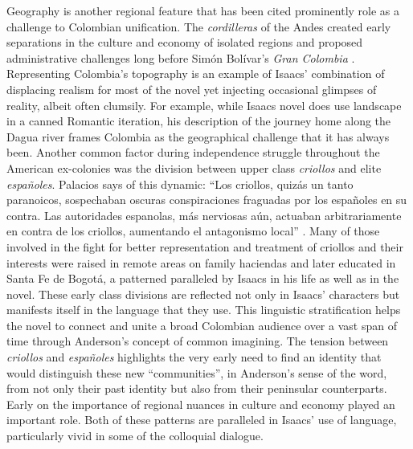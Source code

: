 \documentclass[12pt]{report}\usepackage[]{graphicx}\usepackage[]{color}
\begin{document}
\begin{spacing}{1.9}
Geography is another regional feature that has been cited prominently role as a challenge to Colombian unification.
The \textit{cordilleras} of the Andes created early separations in the culture and economy of isolated regions and proposed administrative challenges long before Simón Bolívar's \textit{Gran Colombia} \autocite[229]{Palacios2002}.
Representing Colombia's topography is an example of Isaacs' combination of displacing realism for most of the novel yet injecting occasional glimpses of reality, albeit often clumsily. 
For example, while Isaacs novel does use landscape in a canned Romantic iteration, his description of the journey home along the Dagua river frames Colombia as the geographical challenge that it has always been.
Another common factor during independence struggle throughout the American ex-colonies was the division between upper class \textit{criollos} and elite \textit{españoles}. 
Palacios says of this dynamic: \enquote{Los criollos, quizás un tanto paranoicos, sospechaban oscuras conspiraciones fraguadas por los españoles en su contra. Las autoridades espanolas, más nerviosas aún, actuaban arbitrariamente en contra de los criollos, aumentando el antagonismo local} \autocite[192]{Palacios2002}. 
Many of those involved in the fight for better representation and treatment of criollos and their interests were raised in remote areas on family haciendas and later educated in Santa Fe de Bogotá, a patterned paralleled by Isaacs in his life as well as in the novel. 
These early class divisions are reflected not only in Isaacs' characters but manifests itself in the language that they use. 
This linguistic stratification helps the novel to connect and unite a broad Colombian audience over a vast span of time through Anderson's concept of common imagining.
The tension between \textit{criollos} and \textit{españoles} highlights the very early need to find an identity that would distinguish these new \enquote{communities}, in Anderson's sense of the word, from not only their past identity but also from their peninsular counterparts. 
Early on the importance of regional nuances in culture and economy played an important role.
Both of these patterns are paralleled in Isaacs' use of language, particularly vivid in some of the colloquial dialogue.



\end{spacing}
\end{document}
